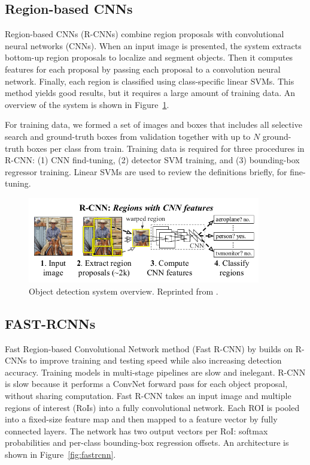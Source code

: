 \subsection{Region-based CNNs}
Region-based CNNs (R-CNNs) \cite{girshick2014rich} combine region proposals with convolutional neural networks (CNNs). When an input image is presented, the system extracts bottom-up region proposals to localize and segment objects. Then it computes features for each proposal by passing each proposal to a convolution neural network. Finally, each region is classified using class-specific linear SVMs. This method yields good results, but it requires a large amount of training data. An overview of the system is shown in Figure~\ref{fig:rcnn}.

For training data, we formed a set of images and boxes that includes all selective search and ground-truth boxes from validation together with up to $N$ ground-truth boxes per class from train. Training data is required for three procedures in R-CNN: (1) CNN find-tuning, (2) detector SVM training, and (3) bounding-box regressor training. Linear SVMs are used to review the definitions briefly, for fine-tuning. 

\begin{figure}[t]
  \centering
  \includegraphics[width=4in]{figures/rcnn.jpg}  
  \caption[R-CNNs]{Object detection system overview. Reprinted from . }
  \label{fig:rcnn}
\end{figure}

\subsection{FAST-RCNNs}
Fast Region-based Convolutional Network method (Fast R-CNN) by  builds on R-CNNs to improve training and testing speed while also increasing detection accuracy. Training models in multi-stage pipelines are slow and inelegant. R-CNN is slow because it performs a ConvNet forward pass for each object proposal, without sharing computation. Fast R-CNN takes an input image and multiple regions of interest (RoIs) into a fully convolutional network. Each ROI is pooled into a fixed-size feature map and then mapped to a feature vector by fully connected layers. The network has two output vectors per RoI: softmax probabilities and per-class bounding-box regression offsets. An architecture is shown in Figure~\ref{fig:fastrcnn}. 

